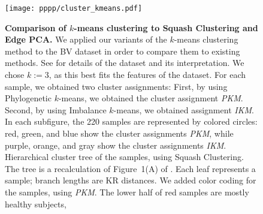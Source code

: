 \begin{figure}[!ht]
    \centering
    \texttt{[image: pppp/cluster\_kmeans.pdf]}
    \begin{subfigure}{0pt}
        \label{fig:cluster_kmeans:sub:mass_tree}
    \end{subfigure}
    \begin{subfigure}{0pt}
        \label{fig:cluster_kmeans:sub:imbalance_tree}
    \end{subfigure}
    \begin{subfigure}{0pt}
        \label{fig:cluster_kmeans:sub:mds}
    \end{subfigure}
    \begin{subfigure}{0pt}
        \label{fig:cluster_kmeans:sub:pca}
    \end{subfigure}
    \begin{subfigure}{0pt}
        \label{fig:cluster_kmeans:sub:edgepca}
    \end{subfigure}
    \caption[Comparison of $k$-means clustering to Squash Clustering and Edge PCA]{
        \textbf{Comparison of $k$-means clustering to Squash Clustering and Edge PCA.}
        We applied our variants of the $k$-means clustering method
        to the \ac{BV} dataset in order to compare them to existing methods.
        See \cite{Srinivasan2012} for details of the dataset and its interpretation.
        We chose $k:=3$, as this best fits the features of the dataset.
        For each sample, we obtained two cluster assignments:
        First, by using Phylogenetic $k$-means, %
        we obtained the cluster assignment \emph{PKM}.
        Second, by using Imbalance $k$-means, we obtained assignment \emph{IKM}.
        In each subfigure, the \num{220} samples are represented by colored circles:
        red, green, and blue show the cluster assignments \emph{PKM},
        while purple, orange, and gray show the cluster assignments \emph{IKM}.
        Hierarchical cluster tree of the samples, using Squash Clustering.
        The tree is a recalculation of Figure~1(A) of \cite{Srinivasan2012}.
        Each leaf represents a sample; branch lengths are KR distances.
        We added color coding for the samples, using \emph{PKM}.
        The lower half of red samples are mostly healthy subjects,
}
\end{figure}
